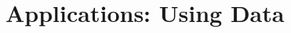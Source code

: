 \documentclass{book}
\begin{document}
%
%
%
%

\part{Applications: Using Data}
\label{part:applications}

%
%
%
%



\appendix
%
%
%


\end{document}
